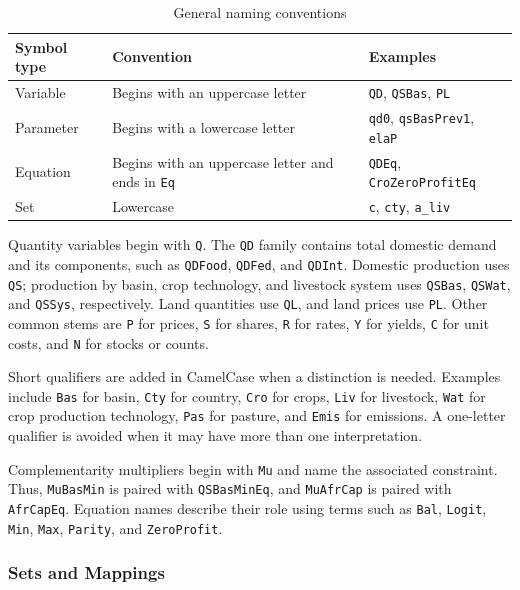 \begin{table}[H]
  \centering
  \caption{General naming conventions}
  \label{tab:development_naming}
  \begin{tabular}{lll}
    \toprule
    Symbol type & Convention & Examples \\
    \midrule
    Variable  & Begins with an uppercase letter & \texttt{QD}, \texttt{QSBas}, \texttt{PL} \\
    Parameter & Begins with a lowercase letter & \texttt{qd0}, \texttt{qsBasPrev1}, \texttt{elaP} \\
    Equation  & Begins with an uppercase letter and ends in \texttt{Eq} & \texttt{QDEq}, \texttt{CroZeroProfitEq} \\
    Set       & Lowercase & \texttt{c}, \texttt{cty}, \texttt{a\_liv} \\
    \bottomrule
  \end{tabular}
\end{table}

Quantity variables begin with \texttt{Q}. The \texttt{QD} family contains total domestic demand and its components, such as \texttt{QDFood}, \texttt{QDFed}, and \texttt{QDInt}. Domestic production uses \texttt{QS}; production by basin, crop technology, and livestock system uses \texttt{QSBas}, \texttt{QSWat}, and \texttt{QSSys}, respectively. Land quantities use \texttt{QL}, and land prices use \texttt{PL}. Other common stems are \texttt{P} for prices, \texttt{S} for shares, \texttt{R} for rates, \texttt{Y} for yields, \texttt{C} for unit costs, and \texttt{N} for stocks or counts.

Short qualifiers are added in CamelCase when a distinction is needed. Examples include \texttt{Bas} for basin, \texttt{Cty} for country, \texttt{Cro} for crops, \texttt{Liv} for livestock, \texttt{Wat} for crop production technology, \texttt{Pas} for pasture, and \texttt{Emis} for emissions. A one-letter qualifier is avoided when it may have more than one interpretation.

Complementarity multipliers begin with \texttt{Mu} and name the associated constraint. Thus, \texttt{MuBasMin} is paired with \texttt{QSBasMinEq}, and \texttt{MuAfrCap} is paired with \texttt{AfrCapEq}. Equation names describe their role using terms such as \texttt{Bal}, \texttt{Logit}, \texttt{Min}, \texttt{Max}, \texttt{Parity}, and \texttt{ZeroProfit}.

\subsubsection{Sets and Mappings}


